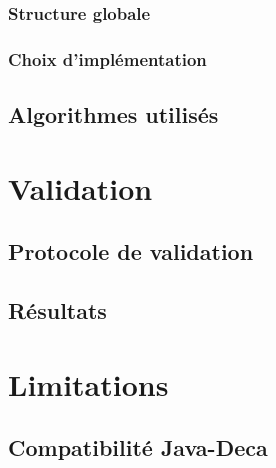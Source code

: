 \documentclass[12pt, a4paper, one side]{article}
\begin{document}
    \subsubsection{Structure globale}
    \subsubsection{Choix d'implémentation}
    \subsection{Algorithmes utilisés}

    \section{Validation}
    \subsection{Protocole de validation}
    \subsection{Résultats}

    \section{Limitations}
    \subsection{Compatibilité Java-Deca}


    \printbibliography
\end{document}
